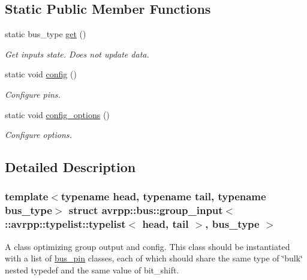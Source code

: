 \subsection*{Static Public Member Functions}
\begin{DoxyCompactItemize}
\item 
static bus\_\-type \hyperlink{structavrpp_1_1bus_1_1group__input_3_01_1_1avrpp_1_1typelist_1_1typelist_3_01head_00_01tail_01_4_00_01bus__type_01_4_aacd793bf3961fec4ceea673acff28c8f}{get} ()
\begin{DoxyCompactList}\small\item\em Get inputs state. Does not update data. \item\end{DoxyCompactList}\item 
static void \hyperlink{structavrpp_1_1bus_1_1group__input_3_01_1_1avrpp_1_1typelist_1_1typelist_3_01head_00_01tail_01_4_00_01bus__type_01_4_ad694de1b8935521a03a1baa88e738ee1}{config} ()
\begin{DoxyCompactList}\small\item\em Configure pins. \item\end{DoxyCompactList}\item 
static void \hyperlink{structavrpp_1_1bus_1_1group__input_3_01_1_1avrpp_1_1typelist_1_1typelist_3_01head_00_01tail_01_4_00_01bus__type_01_4_a81f3c8bca9b60efd7352e799854acaeb}{config\_\-options} ()
\begin{DoxyCompactList}\small\item\em Configure options. \item\end{DoxyCompactList}\end{DoxyCompactItemize}


\subsection{Detailed Description}
\subsubsection*{template$<$typename head, typename tail, typename bus\_\-type$>$ struct avrpp::bus::group\_\-input$<$ ::avrpp::typelist::typelist$<$ head, tail $>$, bus\_\-type $>$}

A class optimizing group output and config. This class should be instantiated with a list of \hyperlink{structavrpp_1_1bus_1_1bus__pin}{bus\_\-pin} classes, each of which should share the same type of \char`\"{}bulk\char`\"{} nested typedef and the same value of bit\_\-shift. 

